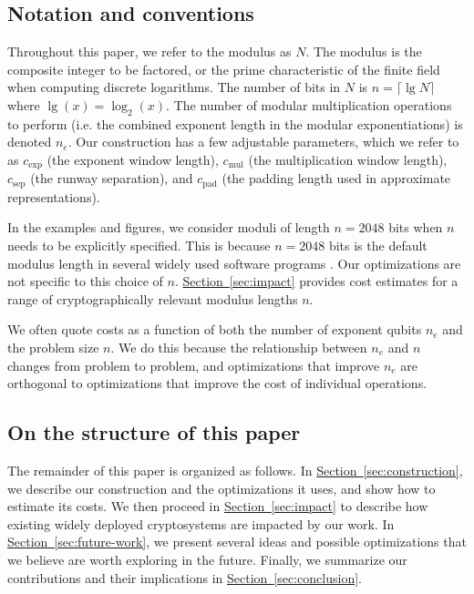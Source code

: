 \documentclass[superscriptaddress,notitlepage,longbibliography]{revtex4-1}
\theoremstyle{definition}
\theoremstyle{definition}
\renewcommand{\sec}[1]{\hyperref[sec:#1]{Section~\ref*{sec:#1}}}
\newcommand{\lenexp}{{n_e}}
\newcommand{\gexp}{{c_{\text{exp}}}}
\newcommand{\gmul}{{c_{\text{mul}}}}
\newcommand{\gsep}{{c_{\text{sep}}}}
\newcommand{\gpad}{{c_{\text{pad}}}}
\begin{document}
\subsection{Notation and conventions}

Throughout this paper, we refer to the modulus as $N$.
The modulus is the composite integer to be factored, or the prime characteristic of the finite field when computing discrete logarithms.
The number of bits in $N$ is $n = \lceil \lg N \rceil$ where $\lg(x) = \log_2(x)$.
The number of modular multiplication operations to perform (i.e. the combined exponent length in the modular exponentiations) is denoted $\lenexp$.
Our construction has a few adjustable parameters, which we refer to as $\gexp$ (the exponent window length), $\gmul$ (the multiplication window length), $\gsep$ (the runway separation), and $\gpad$ (the padding length used in approximate representations).

In the examples and figures, we consider moduli of length $n = 2048$ bits when $n$ needs to be explicitly specified.
This is because $n = 2048$ bits is the default modulus length in several widely used software programs \cite{ssh-keygen-man-page2018, gpg-faq-key-size2018, open-ssl-source2018}.
Our optimizations are not specific to this choice of $n$.
\sec{impact} provides cost estimates for a range of cryptographically relevant modulus lengths $n$.

We often quote costs as a function of both the number of exponent qubits $\lenexp$ and the problem size $n$.
We do this because the relationship between $\lenexp$ and $n$ changes from problem to problem, and optimizations that improve $\lenexp$ are orthogonal to optimizations that improve the cost of individual operations.



\subsection{On the structure of this paper}

The remainder of this paper is organized as follows.
In \sec{construction}, we describe our construction and the optimizations it uses, and show how to estimate its costs.
We then proceed in
\sec{impact} to describe how existing widely deployed cryptosystems are impacted by our work.
In \sec{future-work}, we present several ideas and possible optimizations that we believe are worth exploring in the future.
Finally, we summarize our contributions and their implications in \sec{conclusion}.
\end{document}
